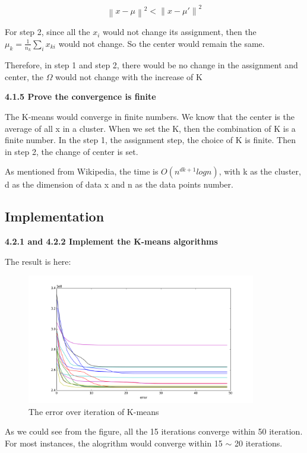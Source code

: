 \documentclass{article} %
\newcommand{\norm}[1]{\left\lVert #1 \right\rVert}
\begin{document}
\begin{equation}
\norm{x - \mu}^2 < \norm{x - \mu'}^2
\end{equation}

For step 2, since all the $x_i$ would not change its assignment, then the $\mu_k =
\frac{1}{n_k} \sum_i x_{ki}$ would not change. So the center would remain the
same.

Therefore, in step 1 and step 2, there would be no change in the assignment and
center, the $\Omega$ would not change with the increase of K

\textbf{4.1.5 Prove the convergence is finite}

The K-means would converge in finite numbers. We know that the center is the
average of all x in a cluster. When we set the K, then the combination of K is a
finite number. In the step 1, the assignment step, the choice of K is
finite. Then in step 2, the change of center is set.

As mentioned from Wikipedia, the time is $O(n^{dk+1} logn)$, with k as the
cluster, d as the dimension of data x and n as the data points number.


\subsection{Implementation}

\textbf{4.2.1 and 4.2.2 Implement the K-means algorithms}

The result is here:

\begin{figure}[!htbp]
\begin{center}
\includegraphics[width=100mm]{pic/q42.png}
\end{center}
\caption{The error over iteration of K-means}
\end{figure}

As we could see from the figure, all the 15 iterations converge within 50
iteration. For most instances, the alogrithm would converge within 15 $\sim$ 20
iterations.
\end{document}
